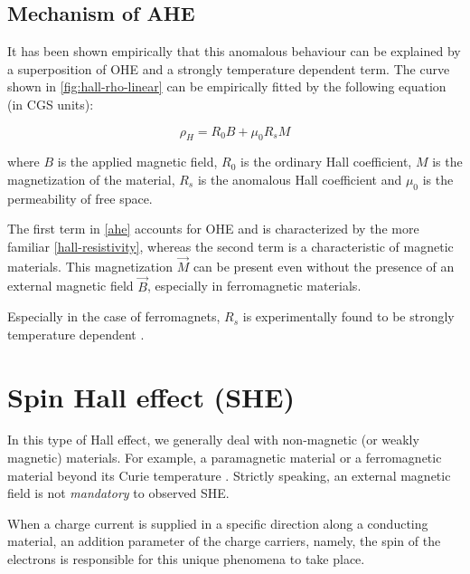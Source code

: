 \subsection{Mechanism of AHE}

It has been shown empirically that this anomalous behaviour can be explained by a superposition of OHE and a strongly temperature dependent term.
The curve shown in \cref{fig:hall-rho-linear}
can be empirically fitted by the following equation (in CGS units):

\begin{equation} \label{ahe}
    \rho_H = R_0 B + \mu_0 R_s M
\end{equation}

where $ B $ is the applied magnetic field, $ R_0 $ is the ordinary Hall coefficient, $ M $ is the magnetization of the material, $ R_s $ is the anomalous Hall coefficient and \( \mu_0 \) is the permeability of free space.

The first term in \cref{ahe} accounts for OHE and is characterized by the more familiar \cref{hall-resistivity}, whereas the second term is a characteristic of magnetic materials.
This magnetization $ \vec{M} $ can be present even without the presence of an external magnetic field $ \vec{B} $, especially in ferromagnetic materials.

Especially in the case of ferromagnets, $ R_s $ is experimentally found to be strongly temperature dependent \cite{hurd2012hall}.









\section{Spin Hall effect (SHE)}

\label{sec:she}

In this type of Hall effect, we generally deal with non-magnetic (or weakly magnetic) materials.
For example, a paramagnetic material or a ferromagnetic material beyond its Curie temperature \cite{hirsch1999spin}.
Strictly speaking, an external magnetic field is not \textit{mandatory} to observed SHE.

When a charge current is supplied in a specific direction along a conducting material, an addition parameter of the charge carriers, namely, the spin of the electrons is responsible for this unique phenomena to take place.

